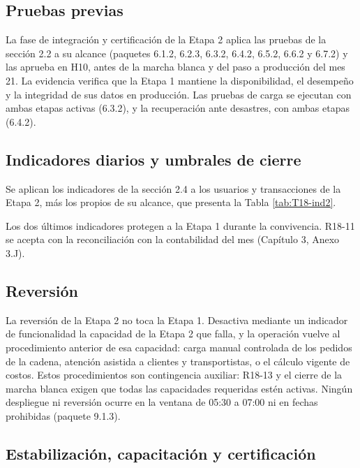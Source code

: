 \subsection{Pruebas previas}

La fase de integración y certificación de la Etapa 2 aplica las pruebas de la sección 2.2 a su alcance (paquetes 6.1.2, 6.2.3, 6.3.2, 6.4.2, 6.5.2, 6.6.2 y 6.7.2) y las aprueba en H10, antes de la marcha blanca y del paso a producción del mes 21. La evidencia verifica que la Etapa 1 mantiene la disponibilidad, el desempeño y la integridad de sus datos en producción. Las pruebas de carga se ejecutan con ambas etapas activas (6.3.2), y la recuperación ante desastres, con ambas etapas (6.4.2).

\subsection{Indicadores diarios y umbrales de cierre}

Se aplican los indicadores de la sección 2.4 a los usuarios y transacciones de la Etapa 2, más los propios de su alcance, que presenta la Tabla \ref{tab:T18-ind2}.


Los dos últimos indicadores protegen a la Etapa 1 durante la convivencia. R18-11 se acepta con la reconciliación con la contabilidad del mes (Capítulo 3, Anexo 3.J).

\subsection{Reversión}

La reversión de la Etapa 2 no toca la Etapa 1. Desactiva mediante un indicador de funcionalidad la capacidad de la Etapa 2 que falla, y la operación vuelve al procedimiento anterior de esa capacidad: carga manual controlada de los pedidos de la cadena, atención asistida a clientes y transportistas, o el cálculo vigente de costos. Estos procedimientos son contingencia auxiliar: R18-13 y el cierre de la marcha blanca exigen que todas las capacidades requeridas estén activas. Ningún despliegue ni reversión ocurre en la ventana de 05:30 a 07:00 ni en fechas prohibidas (paquete 9.1.3).

\subsection{Estabilización, capacitación y certificación}

